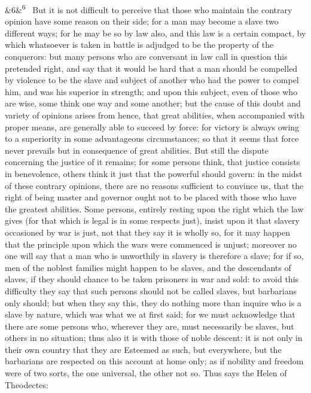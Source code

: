 \documentclass[12pt]{article}
\newcommand{\para}[1][]{\par\noindent\ifx&#1&\else\textsuperscript{\footnotesize #1}~\fi}
\begin{document}
\para[6] But it is not difficult to perceive that those who maintain the contrary opinion have some reason on their side; for a man may become a slave two different ways; for he may be so by law also, and this law is a certain compact, by which whatsoever is taken in battle is adjudged to be the property of the conquerors: but many persons who are conversant in law call in question this pretended right, and say that it would be hard that a man should be compelled by violence to be the slave and subject of another who had the power to compel him, and was his superior in strength; and upon this subject, even of those who are wise, some think one way and some another; but the cause of this doubt and variety of opinions arises from hence, that great abilities, when accompanied with proper means, are generally able to succeed by force: for victory is always owing to a superiority in some advantageous circumstances; so that it seems that force never prevails but in consequence of great abilities. But still the dispute concerning the justice of it remains; for some persons think, that justice consists in benevolence, others think it just that the powerful should govern: in the midst of these contrary opinions, there are no reasons sufficient to convince us, that the right of being master and governor ought not to be placed with those who have the greatest abilities. Some persons, entirely resting upon the right which the law gives (for that which is legal is in some respects just), insist upon it that slavery occasioned by war is just, not that they say it is wholly so, for it may happen that the principle upon which the wars were commenced is unjust; moreover no one will say that a man who is unworthily in slavery is therefore a slave; for if so, men of the noblest families might happen to be slaves, and the descendants of slaves, if they should chance to be taken prisoners in war and sold: to avoid this difficulty they say that such persons should not be called slaves, but barbarians only should; but when they say this, they do nothing more than inquire who is a slave by nature, which was what we at first said; for we must acknowledge that there are some persons who, wherever they are, must necessarily be slaves, but others in no situation; thus also it is with those of noble descent: it is not only in their own country that they are Esteemed as such, but everywhere, but the barbarians are respected on this account at home only; as if nobility and freedom were of two sorts, the one universal, the other not so. Thus says the Helen of Theodectes:
\end{document}
